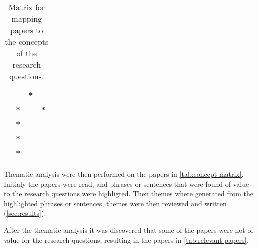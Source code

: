 \begin{table}[H]
\begin{tabular}{llll}
\cite{lmb_2011} &             & \multicolumn{1}{c}{\textbf{*}}           &            \\
\cite{hs_2011}  & \multicolumn{1}{c}{\textbf{*}}            &            & \multicolumn{1}{c}{\textbf{*}} \\
\cite{ds_2014}  & \multicolumn{1}{c}{\textbf{*}}            &            &            \\
\cite{ln_2012}  & \multicolumn{1}{c}{\textbf{*}}            &            &            \\       
\cite{pf_2017}  & \multicolumn{1}{c}{\textbf{*}}            &            &            \\ \hline       
\end{tabular}
\caption{Matrix for mapping papers to the concepts of the research questions.}
\label{tab:concept-matrix}
\end{table}
 
Thematic analysis were then performed on the papers in \autoref{tab:concept-matrix}. Initialy the papers were read, and phrases or sentences that were found of value to the research questions were highligted. Then themes where generated from the highlighted phrases or sentences, themes were then reviewed and written (\autoref{sec:results}). 

After the thematic analysis it was discovered that some of the papers were not of value for the research questions, resulting in the papers in \autoref{tab:relevant-papers}.


